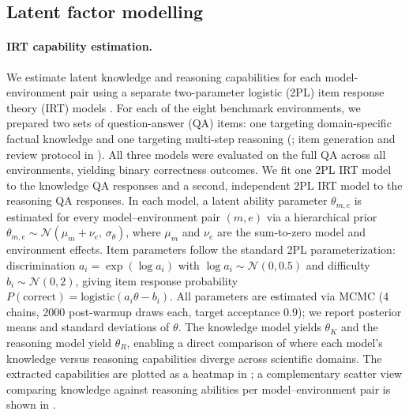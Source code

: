 \begin{table}[H]
\centering
\caption{\textbf{Behavioral marker counts per model and scaffold.} Total number of times each marker was observed across all annotated traces, grouped by sentiment category (Positive, Neutral, Negative). Markers are defined in .}
\label{tab:marker-count}
\small

\end{table}

\subsection{Latent factor modelling}
\label{sec:app_irt}

\paragraph{IRT capability estimation.}
  We estimate latent knowledge and reasoning capabilities for each
  model-environment pair using a separate two-parameter logistic (2PL)
  item response theory (IRT) models \autocite{hori2022item}. For each
  of the eight benchmark environments, we prepared two sets of
  question-answer (QA) items: one targeting domain-specific factual
  knowledge and one targeting multi-step reasoning (; item generation and review protocol in ). All three models
  were evaluated on the full QA across all environments,
  yielding binary correctness outcomes. We fit one 2PL IRT model to the
  knowledge QA responses and a second, independent 2PL IRT model to the
  reasoning QA responses. In each model, a latent ability parameter
  $\theta_{m,e}$ is estimated for every model--environment pair $(m,e)$
  via a hierarchical prior $\theta_{m,e} \sim
  \mathcal{N}(\mu_m + \nu_e,\, \sigma_\theta)$, where $\mu_m$ and
  $\nu_e$ are the sum-to-zero model and environment effects. Item
  parameters follow the standard 2PL parameterization: discrimination
  $a_i = \exp(\log a_i)$ with $\log a_i \sim \mathcal{N}(0, 0.5)$ and
  difficulty $b_i \sim \mathcal{N}(0, 2)$, giving item response
  probability $P(\text{correct}) = \mathrm{logistic}(a_i \theta - b_i)$.
  All parameters are estimated via MCMC (4 chains, 2000 post-warmup
  draws each, target acceptance 0.9); we report posterior means and
  standard deviations of $\theta$. The knowledge model yields
  $\theta_K$ and the reasoning model yield $\theta_R$, enabling a
  direct comparison of where each model's knowledge versus reasoning
  capabilities diverge across scientific domains. The extracted capabilities are plotted as a heatmap in ; a complementary scatter view comparing knowledge against reasoning abilities per model--environment pair is shown in .
  

